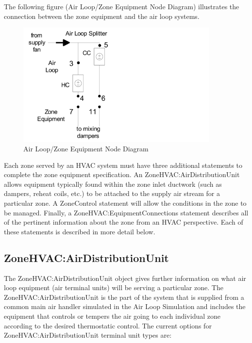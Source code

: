 The following figure (Air Loop/Zone Equipment Node Diagram) illustrates the connection between the zone equipment and the air loop systems.

\begin{figure}[hbtp] %
\centering
\includegraphics[width=0.9\textwidth, height=0.9\textheight, keepaspectratio=true]{media/image263.png}
\caption{Air Loop/Zone Equipment Node Diagram \protect \label{fig:air-loopzone-equipment-node-diagram}}
\end{figure}

Each zone served by an HVAC system must have three additional statements to complete the zone equipment specification. An ZoneHVAC:AirDistributionUnit allows equipment typically found within the zone inlet ductwork (such as dampers, reheat coils, etc.) to be attached to the supply air stream for a particular zone. A ZoneControl statement will allow the conditions in the zone to be managed. Finally, a ZoneHVAC:EquipmentConnections statement describes all of the pertinent information about the zone from an HVAC perspective. Each of these statements is described in more detail below.

\subsection{ZoneHVAC:AirDistributionUnit}\label{zonehvacairdistributionunit}

The ZoneHVAC:AirDistributionUnit object gives further information on what air loop equipment (air terminal units) will be serving a particular zone. The ZoneHVAC:AirDistributionUnit is the part of the system that is supplied from a common main air handler simulated in the Air Loop Simulation and includes the equipment that controls or tempers the air going to each individual zone according to the desired thermostatic control. The current options for ZoneHVAC:AirDistributionUnit terminal unit types are:


